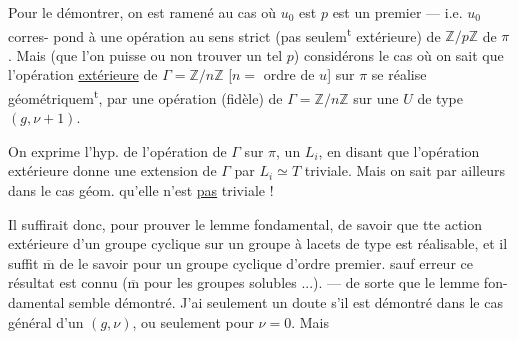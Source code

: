 Pour le démontrer, on est ramené  au
cas où $u_0$ est  
$p$ est un  premier --- i.e. $u_0$ corres-
pond à une opération au sens strict
(pas seulem\textsuperscript{t} extérieure) de $\mathbb Z/p\mathbb Z$  
de $\pi$. Mais (que l'on puisse ou non
trouver un tel $p$) considérons le cas où
on sait que l'opération \uline{extérieure} de
$\Gamma=\mathbb Z/n\mathbb Z$ [$n=$ ordre de $u$] sur $\pi$ se réalise
géométriquem\textsuperscript{t}, par une opération (fidèle)
de $\Gamma=\mathbb Z/n\mathbb Z$ sur une $U$ de type $(g,\nu+1)$.



On exprime l'hyp. de l'opération  de $\Gamma$ sur
$\pi$,   un $L_i$, en disant que
l'opération extérieure donne une extension
de $\Gamma$ par $L_i\simeq T$ triviale. Mais on sait
par ailleurs dans le cas géom.  qu'elle
n'est \uline{pas} triviale !

Il suffirait donc,  pour prouver le
lemme fondamental, de savoir que tte
action extérieure \inserted{[fidèle]} d'un groupe cyclique
sur un groupe à lacets de type 
est réalisable, et il suffit $\overline{\mathrm m}$ de le savoir
pour un groupe cyclique d'ordre
premier.   sauf erreur ce résultat
est  connu ($\overline{\mathrm m}$ pour les groupes 
solubles ...). --- de sorte que le lemme fon-
damental semble démontré. J'ai seulement
un doute s'il est démontré dans le
cas général d'un $(g,\nu)$,  ou seulement
pour  $\nu=0$. Mais 


